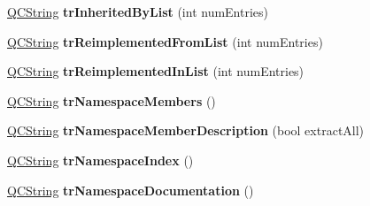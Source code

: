 \begin{DoxyCompactItemize}
\item 
\hypertarget{class_translator_slovene_a1e99444f13f4aaf4381915a7ef64b7e2}{\hyperlink{class_q_c_string}{Q\-C\-String} {\bfseries tr\-Inherited\-By\-List} (int num\-Entries)}\label{class_translator_slovene_a1e99444f13f4aaf4381915a7ef64b7e2}

\item 
\hypertarget{class_translator_slovene_a415a7fcbadfe96bd0ca26878e710c148}{\hyperlink{class_q_c_string}{Q\-C\-String} {\bfseries tr\-Reimplemented\-From\-List} (int num\-Entries)}\label{class_translator_slovene_a415a7fcbadfe96bd0ca26878e710c148}

\item 
\hypertarget{class_translator_slovene_a03896d92ba89b64025ceb367fda22ffb}{\hyperlink{class_q_c_string}{Q\-C\-String} {\bfseries tr\-Reimplemented\-In\-List} (int num\-Entries)}\label{class_translator_slovene_a03896d92ba89b64025ceb367fda22ffb}

\item 
\hypertarget{class_translator_slovene_aab3cb0a2b1911abb6aaa26098a2ba334}{\hyperlink{class_q_c_string}{Q\-C\-String} {\bfseries tr\-Namespace\-Members} ()}\label{class_translator_slovene_aab3cb0a2b1911abb6aaa26098a2ba334}

\item 
\hypertarget{class_translator_slovene_aee9c71c61972950fb45524dbecfa54f9}{\hyperlink{class_q_c_string}{Q\-C\-String} {\bfseries tr\-Namespace\-Member\-Description} (bool extract\-All)}\label{class_translator_slovene_aee9c71c61972950fb45524dbecfa54f9}

\item 
\hypertarget{class_translator_slovene_a3366fecf1ff5ff616f74822b96b0d9fb}{\hyperlink{class_q_c_string}{Q\-C\-String} {\bfseries tr\-Namespace\-Index} ()}\label{class_translator_slovene_a3366fecf1ff5ff616f74822b96b0d9fb}

\item 
\hypertarget{class_translator_slovene_a4b378c543e22d6041d618cffdb734842}{\hyperlink{class_q_c_string}{Q\-C\-String} {\bfseries tr\-Namespace\-Documentation} ()}\label{class_translator_slovene_a4b378c543e22d6041d618cffdb734842}


\end{DoxyCompactItemize}
